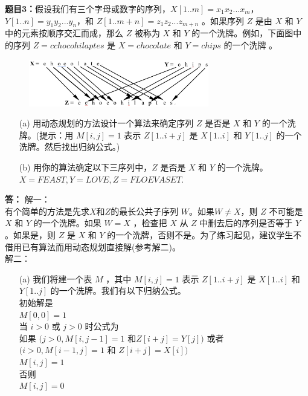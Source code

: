 \documentclass[12pt,a4paper]{article}
\begin{document}
\begin{CJK}{UTF8}{song}
\vspace{10pt}
\noindent
{\bf 题目3：}假设我们有三个字母或数字的序列，$X[1..m]  = x_1x_2 ... x_m$， $Y[1..n]  = y_1y_2...y_n$，和 $Z[1..m+n] = z_1z_2...z_{m+n}$ 。如果序列 $Z$ 是由 $X$ 和 $Y$ 中的元素按顺序交汇而成，那么 $Z$  被称为 $X$ 和 $Y$ 的一个洗牌。例如，下面图中的序列 $Z = cchocohilaptes$ 是 $X = chocolate$ 和 $Y = chips$ 的一个洗牌 。
\begin{figure}[H]
	\centering %
	\includegraphics[width=0.7\textwidth]{3} %
\end{figure}
\begin{enumerate}
	\item[(a)]  用动态规划的方法设计一个算法来确定序列 $Z$ 是否是 $X$ 和 $Y$ 的一个洗牌。(提示：用 $M[i, j] = 1$ 表示 $Z[1..i+j]$ 是 $X[1..i]$ 和 $Y[1..j]$ 的一个洗牌。然后找出归纳公式。)
	\item[(b)]  用你的算法确定以下三序列中，$Z$ 是否是 $X$ 和 $Y$ 的一个洗牌。\\
	$X = FEAST, 	Y = LOVE, 	Z =  FLOEVASET$.
\end{enumerate}
\vspace{5pt}
\noindent
{\bf 答：}
解一：\\
有个简单的方法是先求$X$和$Z$的最长公共子序列 $W$。如果$W \neq X$，则 $Z$ 不可能是 $X$ 和 $Y$ 的一个洗牌。如果 $W = X$ ，检查把 $X$ 从 $Z$ 中删去后的序列是否等于 $Y$ 。如果是，则 $Z$ 是 $X$ 和 $Y$ 的一个洗牌，否则不是。为了练习起见，建议学生不借用已有算法而用动态规划直接解(参考解二)。\\
解二：
\begin{enumerate}
	\item[(a)]  我们将建一个表 $M$ ，其中 $M[i, j] = 1$  表示 $Z[1..i+j]$ 是 $X[1..i]$ 和 $Y[1..j]$ 的一个洗牌。我们有以下归纳公式。\\
	初始解是\\
	$M[0, 0] = 1$\\	
	当 $i >0$ 或 $j > 0$ 时公式为\\
	如果 $(j > 0, M[i, j-1] = 1 $ 和$ Z[i+j] = Y[j] )$ 或者 $(i > 0, M[i-1, j] = 1$ 和 $Z[i+j] = X[i])$\\
	$M[i, j] = 1$\\ 
	否则\\
	$M[i, j] = 0$ \\

\end{enumerate}
\end{CJK}
\end{document}
